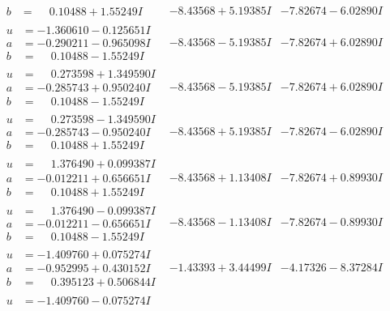 \documentclass[1p]{elsarticle_modified}
\theoremstyle{definition}
\begin{document}
$$\begin{array}{c|c|c}
\begin{aligned}
b &= \phantom{-}0.10488 + 1.55249 I\end{aligned}
 & -8.43568 + 5.19385 I & -7.82674 - 6.02890 I \\ \hline\begin{aligned}
u &= -1.360610 - 0.125651 I \\
a &= -0.290211 - 0.965098 I \\
b &= \phantom{-}0.10488 - 1.55249 I\end{aligned}
 & -8.43568 - 5.19385 I & -7.82674 + 6.02890 I \\ \hline\begin{aligned}
u &= \phantom{-}0.273598 + 1.349590 I \\
a &= -0.285743 + 0.950240 I \\
b &= \phantom{-}0.10488 - 1.55249 I\end{aligned}
 & -8.43568 - 5.19385 I & -7.82674 + 6.02890 I \\ \hline\begin{aligned}
u &= \phantom{-}0.273598 - 1.349590 I \\
a &= -0.285743 - 0.950240 I \\
b &= \phantom{-}0.10488 + 1.55249 I\end{aligned}
 & -8.43568 + 5.19385 I & -7.82674 - 6.02890 I \\ \hline\begin{aligned}
u &= \phantom{-}1.376490 + 0.099387 I \\
a &= -0.012211 + 0.656651 I \\
b &= \phantom{-}0.10488 + 1.55249 I\end{aligned}
 & -8.43568 + 1.13408 I & -7.82674 + 0.89930 I \\ \hline\begin{aligned}
u &= \phantom{-}1.376490 - 0.099387 I \\
a &= -0.012211 - 0.656651 I \\
b &= \phantom{-}0.10488 - 1.55249 I\end{aligned}
 & -8.43568 - 1.13408 I & -7.82674 - 0.89930 I \\ \hline\begin{aligned}
u &= -1.409760 + 0.075274 I \\
a &= -0.952995 + 0.430152 I \\
b &= \phantom{-}0.395123 + 0.506844 I\end{aligned}
 & -1.43393 + 3.44499 I & -4.17326 - 8.37284 I \\ \hline\begin{aligned}
u &= -1.409760 - 0.075274 I \\

\end{aligned}
\end{array}$$
\end{document}
